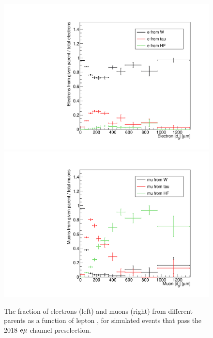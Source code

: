 \begin{figure}[hbtp]
\centering
\includegraphics[scale=0.35]{figures/bg/emu_tt_electronAbsD0_1000um_variableBins_coarse_ratios.pdf}
\includegraphics[scale=0.35]{figures/bg/emu_tt_muonAbsD0_1000um_variableBins_coarse_ratios.pdf}
\caption{The fraction of electrons (left) and muons (right) from different parents as a function of lepton \ad, for simulated \ttbar events that pass the 2018 $\mathrm{e}{\mu}$ channel preselection.}
\label{ttbar_d0_behavior}
\end{figure}